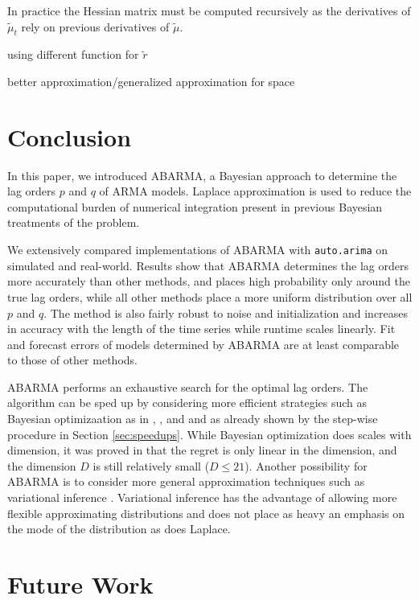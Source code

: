 In practice the Hessian matrix must be computed recursively as the derivatives of $\tilde{\mu}_t$ rely on previous derivatives of $\tilde{\mu}$.  


using different function for $\tilde{r}$

better approximation/generalized approximation for space
\fi 

\section{Conclusion}
\label{sec: conclusion}

In this paper, we introduced ABARMA, a Bayesian approach to determine the lag orders $p$ and $q$ of ARMA models. Laplace approximation is used to reduce the computational burden of numerical integration present in previous Bayesian treatments of the problem.

We extensively compared implementations of ABARMA with {\tt auto.arima} on simulated and real-world. Results show that ABARMA determines the lag orders more accurately than other methods, and places high probability only around the true lag orders, while all other methods place a more uniform distribution over all $p$ and $q$.  The method is also fairly robust to noise and initialization and increases in accuracy with the length of the time series while runtime scales linearly.  Fit and forecast errors of models determined by ABARMA are at least comparable to those of other methods.

ABARMA performs an exhaustive search for the optimal lag orders. The algorithm can be sped up by considering more efficient strategies such as Bayesian optimizaation as in \cite{snoek2012},  \cite{bergstra2011}, and \cite{snoek2015} and as already shown by the step-wise procedure in Section \ref{sec:speedups}.  While Bayesian optimization does scales with dimension, it was proved in \cite{kandasamy2015} that the regret is only linear in the dimension, and the dimension $D$ is still relatively small ($D \leq 21$). Another possibility for ABARMA is to consider more general approximation techniques such as  variational inference \cite{blei2016variational}.  Variational inference has the advantage of allowing more flexible approximating distributions and does not place as heavy an emphasis on the mode of the distribution as does Laplace.


\iffalse

\section{Future Work}
\label{sec: fw}

